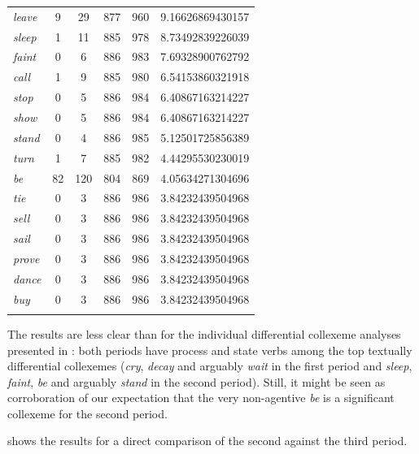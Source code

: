 \begin{table}
{\begin{tabular}[t]{l *{2}{S[table-format=2]} *{2}{S[table-format=3]} S[table-format=1.2]}
\midrule
\textit{leave} & 9 & 29 & 877 & 960 & 9.16626869430157 \\
\textit{sleep} & 1 & 11 & 885 & 978 & 8.73492839226039 \\
\textit{faint} & 0 & 6 & 886 & 983 & 7.69328900762792 \\
\textit{call} & 1 & 9 & 885 & 980 & 6.54153860321918 \\
\textit{stop} & 0 & 5 & 886 & 984 & 6.40867163214227 \\
\textit{show} & 0 & 5 & 886 & 984 & 6.40867163214227 \\
\textit{stand} & 0 & 4 & 886 & 985 & 5.12501725856389 \\
\textit{turn} & 1 & 7 & 885 & 982 & 4.44295530230019 \\
\textit{be} & 82 & 120 & 804 & 869 & 4.05634271304696 \\
\textit{tie} & 0 & 3 & 886 & 986 & 3.84232439504968 \\
\textit{sell} & 0 & 3 & 886 & 986 & 3.84232439504968 \\
\textit{sail} & 0 & 3 & 886 & 986 & 3.84232439504968 \\
\textit{prove} & 0 & 3 & 886 & 986 & 3.84232439504968 \\
\textit{dance} & 0 & 3 & 886 & 986 & 3.84232439504968 \\
\textit{buy} & 0 & 3 & 886 & 986 & 3.84232439504968 \\
\lspbottomrule
\end{tabular}}
\end{table}

The results are less clear than for the individual differential collexeme  analyses presented in : both periods have process  and state  verbs  among the top textually differential collexemes (\textit{cry}, \textit{decay} and arguably \textit{wait} in the first period and \textit{sleep}, \textit{faint}, \textit{be} and arguably \textit{stand} in the second period). Still, it might be seen as corroboration of our expectation that the very non\hyp{}agentive  \textit{be} is a significant collexeme for the second period.

 shows the results for a direct comparison of the second against the third period.

